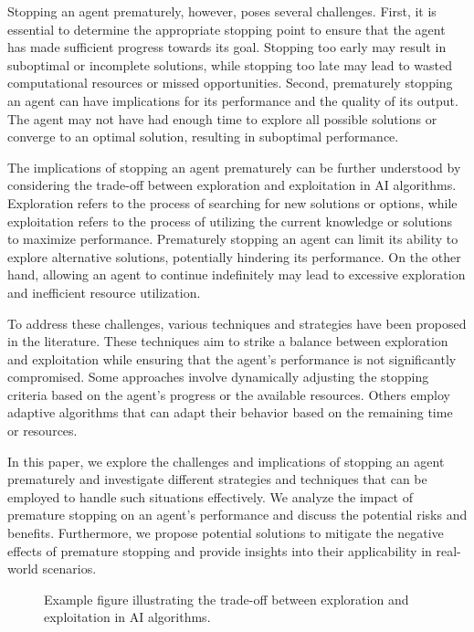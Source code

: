 \documentclass{article}
\begin{document}
Stopping an agent prematurely, however, poses several challenges. First, it is essential to determine the appropriate stopping point to ensure that the agent has made sufficient progress towards its goal. Stopping too early may result in suboptimal or incomplete solutions, while stopping too late may lead to wasted computational resources or missed opportunities. Second, prematurely stopping an agent can have implications for its performance and the quality of its output. The agent may not have had enough time to explore all possible solutions or converge to an optimal solution, resulting in suboptimal performance.

The implications of stopping an agent prematurely can be further understood by considering the trade-off between exploration and exploitation in AI algorithms. Exploration refers to the process of searching for new solutions or options, while exploitation refers to the process of utilizing the current knowledge or solutions to maximize performance. Prematurely stopping an agent can limit its ability to explore alternative solutions, potentially hindering its performance. On the other hand, allowing an agent to continue indefinitely may lead to excessive exploration and inefficient resource utilization.

To address these challenges, various techniques and strategies have been proposed in the literature. These techniques aim to strike a balance between exploration and exploitation while ensuring that the agent's performance is not significantly compromised. Some approaches involve dynamically adjusting the stopping criteria based on the agent's progress or the available resources. Others employ adaptive algorithms that can adapt their behavior based on the remaining time or resources.

In this paper, we explore the challenges and implications of stopping an agent prematurely and investigate different strategies and techniques that can be employed to handle such situations effectively. We analyze the impact of premature stopping on an agent's performance and discuss the potential risks and benefits. Furthermore, we propose potential solutions to mitigate the negative effects of premature stopping and provide insights into their applicability in real-world scenarios.

\begin{figure}[h]
  \centering
  \caption{Example figure illustrating the trade-off between exploration and exploitation in AI algorithms.}
  \label{fig:tradeoff}
\end{figure}
\end{document}
